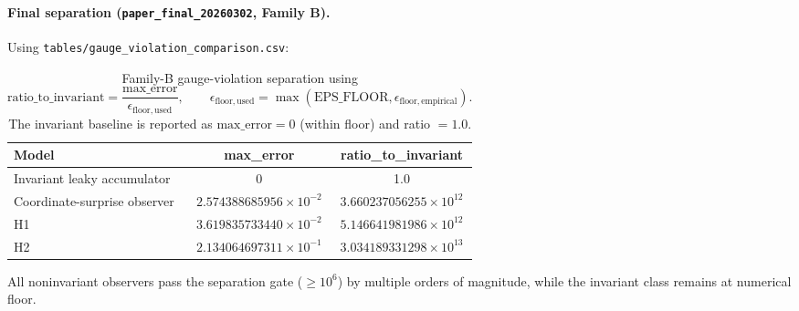 \paragraph{Final separation (\texttt{paper\_final\_20260302}, Family B).}
Using \texttt{tables/gauge\_violation\_comparison.csv}:
\begin{table}[H]
\centering
\caption{Family-B gauge-violation separation using
\[
\mathrm{ratio\_to\_invariant}
=
\frac{\mathrm{max\_error}}{\epsilon_{\mathrm{floor,used}}},
\qquad
\epsilon_{\mathrm{floor,used}}=\max(\mathrm{EPS\_FLOOR},\epsilon_{\mathrm{floor,empirical}}).
\]
The invariant baseline is reported as $\mathrm{max\_error}=0$ (within floor) and ratio $=1.0$.}
\label{tab:gauge_violation_final_B}
\begin{tabular}{@{}lcc@{}}
\toprule
Model & max\_error & ratio\_to\_invariant \\
\midrule
Invariant leaky accumulator & 0 & 1.0 \\
Coordinate-surprise observer & $2.574388685956\times 10^{-2}$ & $3.660237056255\times 10^{12}$ \\
H1 & $3.619835733440\times 10^{-2}$ & $5.146641981986\times 10^{12}$ \\
H2 & $2.134064697311\times 10^{-1}$ & $3.034189331298\times 10^{13}$ \\
\bottomrule
\end{tabular}
\end{table}

All noninvariant observers pass the separation gate ($\ge 10^6$) by multiple orders of magnitude, while the invariant class remains at numerical floor.
